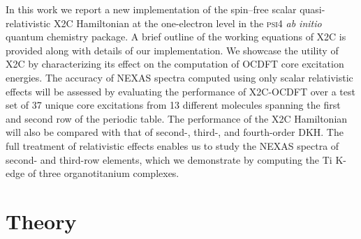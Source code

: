 \documentclass{article}
\begin{document}
In this work we report a new implementation of the spin--free scalar quasi-relativistic X2C Hamiltonian at the one-electron level in the \textsc{psi4} \textit{ab initio} quantum chemistry package\cite{PSI4}. A brief outline of the working equations of X2C is provided along with details of our implementation. We showcase the utility of X2C by characterizing its effect on the computation of OCDFT core excitation energies. The accuracy of NEXAS spectra computed using only scalar relativistic effects will be assessed by evaluating the performance of X2C-OCDFT over a test set of 37 unique core excitations from 13 different molecules spanning the first and second row of the periodic table. The performance of the X2C Hamiltonian will also be compared with that of second-, third-, and fourth-order DKH. The full treatment of relativistic effects enables us to study the NEXAS spectra of second- and third-row elements, which we demonstrate by computing the Ti K-edge of three organotitanium complexes. 

\section{Theory}
\end{document}
